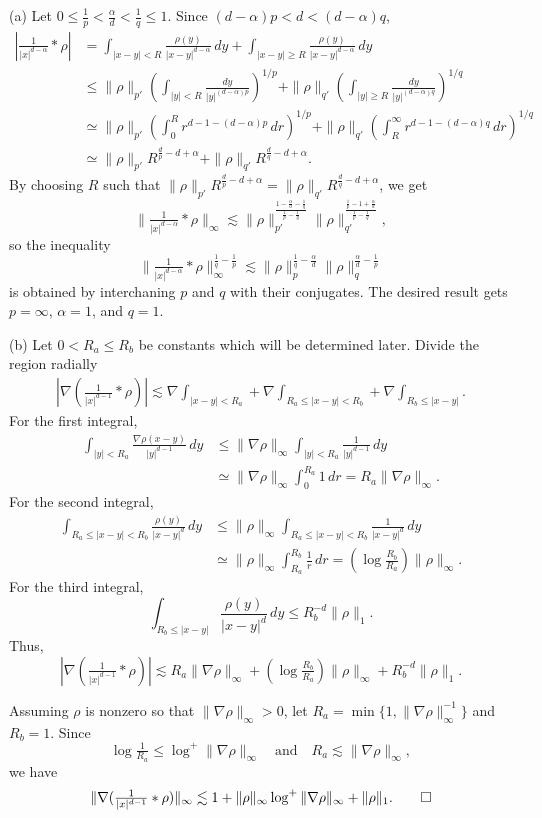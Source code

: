 \documentclass{article}
\begin{document}
\begin{pf}
(a)
Let $0\le\frac1p<\frac\alpha d<\frac1q\le1$.
Since $(d-\alpha)p<d<(d-\alpha)q$,
\begin{align*}
|\tfrac1{|x|^{d-\alpha}}*\rho|
&=\int_{|x-y|<R}\frac{\rho(y)}{|x-y|^{d-\alpha}}\,dy+\int_{|x-y|\ge R}\frac{\rho(y)}{|x-y|^{d-\alpha}}\,dy\\
&\le\|\rho\|_{p'}(\int_{|y|<R}\frac{dy}{|y|^{(d-\alpha)p}})^{1/p}+\|\rho\|_{q'}(\int_{|y|\ge R}\frac{dy}{|y|^{(d-\alpha)q}})^{1/q}\\
&\simeq\|\rho\|_{p'}(\int_0^Rr^{d-1-(d-\alpha)p}\,dr)^{1/p}+\|\rho\|_{q'}(\int_R^\infty r^{d-1-(d-\alpha)q}\,dr)^{1/q}\\
&\simeq\|\rho\|_{p'}R^{\frac dp-d+\alpha}+\|\rho\|_{q'}R^{\frac dq-d+\alpha}.
\end{align*}
By choosing $R$ such that $\|\rho\|_{p'}R^{\frac dp-d+\alpha}=\|\rho\|_{q'}R^{\frac dq-d+\alpha}$, we get
\[\|\tfrac1{|x|^{d-\alpha}}*\rho\|_\infty\lesssim\|\rho\|_{p'}^{\frac{1-\frac\alpha d-\frac1q}{\frac1p-\frac1q}}\|\rho\|_{q'}^{\frac{\frac1p-1+\frac\alpha d}{\frac1p-\frac1q}},\]
so the inequality
\[\|\tfrac1{|x|^{d-\alpha}}*\rho\|_\infty^{\frac1q-\frac1p}\lesssim\|\rho\|_p^{\frac1q-\frac\alpha d}\|\rho\|_q^{\frac\alpha d-\frac1p}\]
is obtained by interchaning $p$ and $q$ with their conjugates.
The desired result gets $p=\infty$, $\alpha=1$, and $q=1$.

(b)
Let $0<R_a\le R_b$ be constants which will be determined later.
Divide the region radially
\begin{align*}
|\nabla(\tfrac1{|x|^{d-1}}*\rho)|\lesssim\nabla\int_{|x-y|<R_a}+\nabla\int_{R_a\le|x-y|<R_b}+\nabla\int_{R_b\le|x-y|}.
\end{align*}
For the first integral,
\begin{align*}
\int_{|y|<R_a}\frac{\nabla\rho(x-y)}{|y|^{d-1}}\,dy
&\le\|\nabla\rho\|_\infty\int_{|y|<R_a}\frac1{|y|^{d-1}}\,dy\\
&\simeq\|\nabla\rho\|_\infty\int_0^{R_a}1\,dr
=R_a\|\nabla\rho\|_\infty.
\end{align*}
For the second integral,
\begin{align*}
\int_{R_a\le|x-y|<R_b}\frac{\rho(y)}{|x-y|^d}\,dy
&\le\|\rho\|_\infty\int_{R_a\le|x-y|<R_b}\frac1{|x-y|^d}\,dy\\
&\simeq\|\rho\|_\infty\int_{R_a}^{R_b}\frac1r\,dr
=(\log\tfrac{R_b}{R_a})\|\rho\|_\infty.
\end{align*}
For the third integral,
\[\int_{R_b\le|x-y|}\frac{\rho(y)}{|x-y|^d}\,dy\le R_b^{-d}\|\rho\|_1.\]
Thus,
\[|\nabla(\tfrac1{|x|^{d-1}}*\rho)|\lesssim R_a\|\nabla\rho\|_\infty+(\log\tfrac{R_b}{R_a})\|\rho\|_\infty+R_b^{-d}\|\rho\|_1.\]

Assuming $\rho$ is nonzero so that $\|\nabla\rho\|_\infty>0$, let $R_a=\min\{1,\|\nabla\rho\|_\infty^{-1}\}$ and $R_b=1$.
Since
\[\log\tfrac1{R_a}\le\log^+\|\nabla\rho\|_\infty\quad\text{and}\quad R_a\lesssim\|\nabla\rho\|_\infty,\]
we have
\[\|\nabla(\tfrac1{|x|^{d-1}}*\rho)\|_\infty\lesssim1+\|\rho\|_\infty\log^+\|\nabla\rho\|_\infty+\|\rho\|_1.\qedhere\]
\end{pf}
\end{document}

